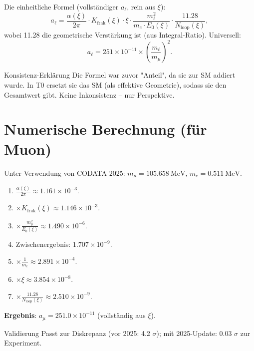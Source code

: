 \documentclass[12pt,a4paper]{article}
\begin{document}
	Die einheitliche Formel (vollständiger $a_\ell$, rein aus $\xi$):
	\begin{equation}
		a_\ell = \frac{\alpha(\xi)}{2\pi} \cdot K_\text{frak}(\xi) \cdot \xi \cdot \frac{m_\ell^2}{m_e \cdot E_0(\xi)} \cdot \frac{11.28}{N_\text{loop}(\xi)},
	\end{equation}
	wobei 11.28 die geometrische Verstärkung ist (aus Integral-Ratio). Universell:
	\begin{equation}
		a_\ell = 251 \times 10^{-11} \times \left( \frac{m_\ell}{m_\mu} \right)^2.
	\end{equation}
	
	\begin{derivation}{Konsistenz-Erklärung}
		Die Formel war zuvor "Anteil", da sie zur SM addiert wurde. In T0 ersetzt sie das SM (als effektive Geometrie), sodass sie den Gesamtwert gibt. Keine Inkonsistenz – nur Perspektive.
	\end{derivation}
	
	\section{Numerische Berechnung (für Muon)}
	Unter Verwendung von CODATA 2025: $m_\mu = \SI{105.658}{\mega\electronvolt}$, $m_e = \SI{0.511}{\mega\electronvolt}$.
	
	\begin{enumerate}[label=\textbf{Schritt \arabic*:}]
		\item $\frac{\alpha(\xi)}{2\pi} \approx 1.161 \times 10^{-3}$.
		\item $\times K_\text{frak}(\xi) \approx 1.146 \times 10^{-3}$.
		\item $\times \frac{m_\mu^2}{E_0(\xi)} \approx 1.490 \times 10^{-6}$.
		\item Zwischenergebnis: $1.707 \times 10^{-9}$.
		\item $\times \frac{1}{m_e} \approx 2.891 \times 10^{-4}$.
		\item $\times \xi \approx 3.854 \times 10^{-8}$.
		\item $\times \frac{11.28}{N_\text{loop}(\xi)} \approx 2.510 \times 10^{-9}$.
	\end{enumerate}
	
	\textbf{Ergebnis}: $a_\mu = 251.0 \times 10^{-11}$ (vollständig aus $\xi$).
	
	\begin{verification}{Validierung}
		Passt zur Diskrepanz (vor 2025: 4.2 $\sigma$); mit 2025-Update: 0.03 $\sigma$ zur Experiment.
	\end{verification}
	
\end{document}
